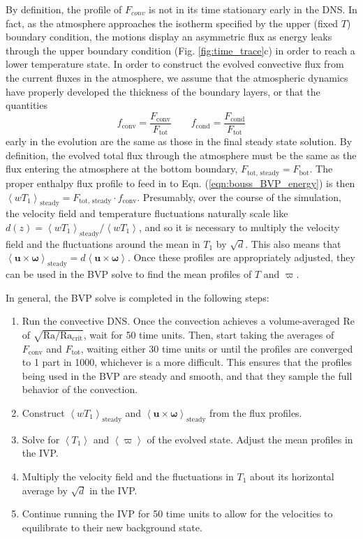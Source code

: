 \documentclass[aps, pre, onecolumn, nofootinbib, notitlepage, groupedaddress, amsfonts, amssymb, amsmath, longbibliography]{revtex4-1}
\newcommand{\angles}[1]{\ensuremath{\left\langle #1 \right\rangle}}
\begin{document}
By definition, the profile of $F_{conv}$ is not in its time stationary early in the DNS.  
In fact, as the atmosphere approaches the
isotherm specified by the upper (fixed $T$) boundary condition, the motions display an asymmetric flux as energy
leaks through the upper boundary condition (Fig. \ref{fig:time_trace}c) in order to reach a lower temperature state.
In order to construct the evolved convective flux from the current fluxes in the atmosphere,
we assume that the atmospheric dynamics have properly developed the thickness of the boundary layers, 
or that the quantities
\begin{equation}
f_{\text{conv}} = \frac{F_{\text{conv}}}{F_{\text{tot}}}\qquad
f_{\text{cond}} = \frac{F_{\text{cond}}}{F_{\text{tot}}}
\end{equation}
early in the evolution are the same as those in the final steady state solution. By definition, the
evolved total flux through the atmosphere must be the same as the flux entering the atmosphere at the
bottom boundary, $F_{\text{tot, steady}} = F_{\text{bot}}$.  The proper enthalpy flux profile to feed in
to Eqn. (\ref{eqn:bouss_BVP_energy}) is then 
$\angles{w T_1}_{\text{steady}} = F_{\text{tot, steady}} \cdot f_{\text{conv}}$.  Presumably, over the
course of the simulation, the velocity field and temperature fluctuations naturally scale like
$d(z) = \angles{w T_1}_{\text{steady}}/\angles{w T_1}$, and so it is necessary to multiply the velocity
field and the fluctuations around the mean in $T_1$ by $\sqrt{d}$.  This also means that
$\angles{\bm{u}\times\bm{\omega}}_{\text{steady}} = d \angles{\bm{u}\times\bm{\omega}}$. Once these profiles
are appropriately adjusted, they can be used in the BVP solve to find the mean profiles of $T$ and $\varpi$.

In general, the BVP solve is completed in the following steps:
\begin{enumerate}
\item Run the convective DNS. Once the convection achieves a volume-averaged Re of $\sqrt{\text{Ra}/\text{Ra}_{\text{crit}}}$,
wait for 50 time units.  Then, start taking the averages of $F_{\text{conv}}$ and $F_{\text{tot}}$, waiting either
30 time units or until the profiles are converged to 1 part in 1000, whichever is a more difficult. This ensures that
the profiles being used in the BVP are steady and smooth, and that they sample the full behavior of the convection.
\item Construct $\angles{w T_1}_{\text{steady}}$ and $\angles{\bm{u}\times\bm{\omega}}_{\text{steady}}$
from the flux profiles.
\item Solve for $\angles{T_1}$ and \angles{\varpi} of the
evolved state.  Adjust the mean profiles in the IVP.
\item Multiply the velocity field and the fluctuations in $T_1$ about its horizontal average by $\sqrt{d}$ in the IVP. 
\item Continue running the IVP for 50 time units to allow for the velocities to equilibrate to their new background state.
\end{enumerate}
\end{document}
